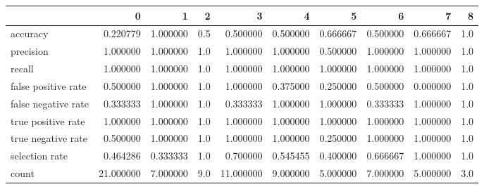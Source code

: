 \begin{tabular}{lrrrrrrrrr}
\toprule
{} &          0 &         1 &    2 &          3 &         4 &         5 &         6 &         7 &    8 \\
\midrule
accuracy            &   0.220779 &  1.000000 &  0.5 &   0.500000 &  0.500000 &  0.666667 &  0.500000 &  0.666667 &  1.0 \\
precision           &   1.000000 &  1.000000 &  1.0 &   1.000000 &  1.000000 &  0.500000 &  1.000000 &  1.000000 &  1.0 \\
recall              &   1.000000 &  1.000000 &  1.0 &   1.000000 &  1.000000 &  1.000000 &  1.000000 &  1.000000 &  1.0 \\
false positive rate &   0.500000 &  1.000000 &  1.0 &   1.000000 &  0.375000 &  0.250000 &  0.500000 &  0.000000 &  1.0 \\
false negative rate &   0.333333 &  1.000000 &  1.0 &   0.333333 &  1.000000 &  1.000000 &  0.333333 &  1.000000 &  1.0 \\
true positive rate  &   1.000000 &  1.000000 &  1.0 &   1.000000 &  1.000000 &  1.000000 &  1.000000 &  1.000000 &  1.0 \\
true negative rate  &   0.500000 &  1.000000 &  1.0 &   1.000000 &  1.000000 &  0.250000 &  1.000000 &  1.000000 &  1.0 \\
selection rate      &   0.464286 &  0.333333 &  1.0 &   0.700000 &  0.545455 &  0.400000 &  0.666667 &  1.000000 &  1.0 \\
count               &  21.000000 &  7.000000 &  9.0 &  11.000000 &  9.000000 &  5.000000 &  7.000000 &  5.000000 &  3.0 \\
\bottomrule
\end{tabular}
